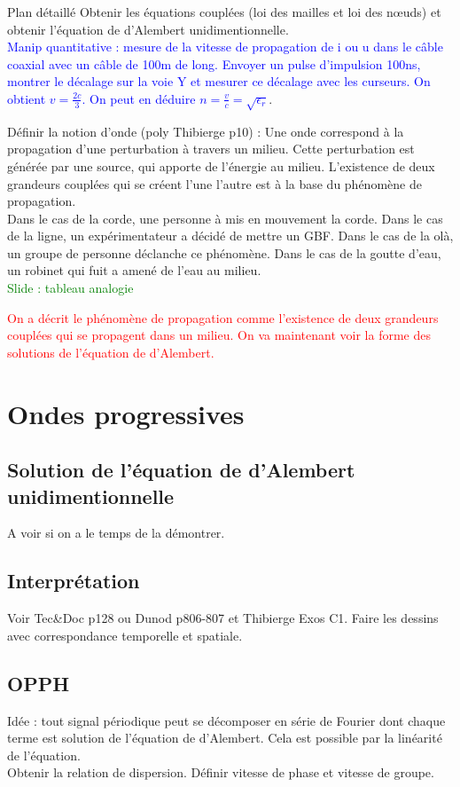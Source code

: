 \begin{reportBlock}{Plan détaillé}
  Obtenir les équations couplées (loi des mailles et loi des n\oe uds) et obtenir l'équation de d'Alembert unidimentionnelle.\\
  \textcolor{blue}{Manip quantitative : mesure de la vitesse de propagation de i ou u dans le câble coaxial avec un câble de 100m de long. Envoyer un pulse d'impulsion 100ns, montrer le décalage sur la voie Y et mesurer ce décalage avec les curseurs. On obtient $v=\frac{2c}{3}$. On peut en déduire $n=\frac{v}{c}=\sqrt{\epsilon_r}$}.

  Définir la notion d'onde (poly Thibierge p10) : \og Une onde correspond à la propagation d’une perturbation à travers un milieu. Cette perturbation est générée par une source, qui apporte de l’énergie au milieu. L'existence de deux grandeurs couplées qui se créent l'une l'autre est à la base du phénomène de propagation.\\

  Dans le cas de la corde, une personne à mis en mouvement la corde. Dans le cas de la ligne, un expérimentateur a décidé de mettre un GBF. Dans le cas de la olà, un groupe de personne déclanche ce phénomène. Dans le cas de la goutte d'eau, un robinet qui fuit a amené de l'eau au milieu.\\

  \textcolor{green}{Slide : tableau analogie}
  
  \textcolor{red}{On a décrit le phénomène de propagation comme l'existence de deux grandeurs couplées qui se propagent dans un milieu. On va maintenant voir la forme des solutions de l'équation de d'Alembert.}
  
  

  \section{Ondes progressives}
  \subsection{Solution de l'équation de d'Alembert unidimentionnelle}
  A voir si on a le temps de la démontrer.
  
  \subsection{Interprétation}
  Voir Tec\&Doc p128 ou Dunod p806-807 et Thibierge Exos C1. Faire les dessins avec correspondance temporelle et spatiale.

  \subsection{OPPH}
  Idée : tout signal périodique peut se décomposer en série de Fourier dont chaque terme est solution de l'équation de d'Alembert. Cela est possible par la linéarité de l'équation.\\
  Obtenir la relation de dispersion. Définir vitesse de phase et vitesse de groupe. 
  

\end{reportBlock}
